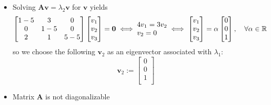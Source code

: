 \documentclass[12pt,a4paper]{article}
\begin{document}
\begin{itemize}
\begin{itemize}
  \item Solving $\bm{A}\bm{v}=\lambda_{2}\bm{v}$ for $\bm{v}$ yields
    \begin{equation}\nonumber%
      \begin{bmatrix}
        1-5 & 3 & 0 \\
        0 & 1-5 & 0 \\
        2 & 1 & 5-5 \\
      \end{bmatrix}
      \begin{bmatrix}
        v_{1} \\
        v_{2} \\
        v_{3} \\
      \end{bmatrix}
      = \bm{0}
      \iff
      \begin{matrix*}[l]
        4v_{1} = 3v_{2} \\
        v_{2} = 0 \\
      \end{matrix*}
      \iff
      \begin{bmatrix}
        v_{1} \\
        v_{2} \\
        v_{3} \\
      \end{bmatrix}
      =
      \alpha
      \begin{bmatrix}
        0 \\
        0 \\
        1 \\
      \end{bmatrix},
      \quad \forall \alpha \in \R
    \end{equation}
    so we choose the following $\bm{v}_{2}$ as an eigenvector associated with $\lambda_{1}$:
    \begin{equation}\nonumber%
      \bm{v}_{2} := 
      \begin{bmatrix}
        0 \\
        0 \\
        1 \\
      \end{bmatrix}
    \end{equation}
  \item Matrix $\bm{A}$ is not diagonalizable

  \end{itemize}


\end{itemize}
\end{document}
